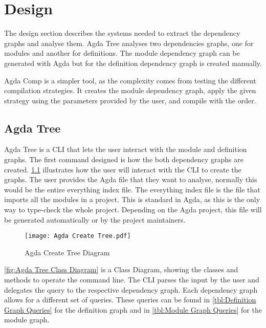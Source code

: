 
\chapter{Design}

The design section describes the systems needed to extract the dependency
graphs and analyse them. Agda Tree analyses two dependencies graphs, one for
modules and another for definitions. The module dependency graph can be
generated with Agda but for the definition dependency graph is created
manually.

Agda Comp is a simpler tool, as the complexity comes from testing the different
compilation strategies. It creates the module dependency graph, apply the
given strategy using the parameters provided by the user, and compile with the
order. 

\pagebreak

\section{Agda Tree}

Agda Tree is a CLI that lets the user interact with the
module and definition graphs. The first command designed is how the both
dependency graphs are created. \cref{fig:Agda Create Tree Diagram} illustrates
how the user will interact with the CLI to create the graphs. The user provides
the Agda file that they want to analyse, normally this would be the entire
everything index file. The everything index file is the file that imports all
the modules in a project. This is standard in Agda, as this is the only way to
type-check the whole project. Depending on the Agda project, this file will be
generated automatically or by the project maintainers.
\begin{figure}[H]
    \centering
    \texttt{[image: Agda Create Tree.pdf]}
    \caption{Agda Create Tree Diagram}
    \label{fig:Agda Create Tree Diagram}
\end{figure} 

\pagebreak

\cref{fig:Agda Tree Class Diagram} is a Class Diagram, showing the classes and
methods to operate the command line. The CLI parses the input by the user and
delegates the query to the respective dependency graph. Each dependency graph
allows for a different set of queries. These queries can be found in
\cref{tbl:Definition Graph Queries} for the definition graph and in
\cref{tbl:Module Graph Queries} for the module graph.


